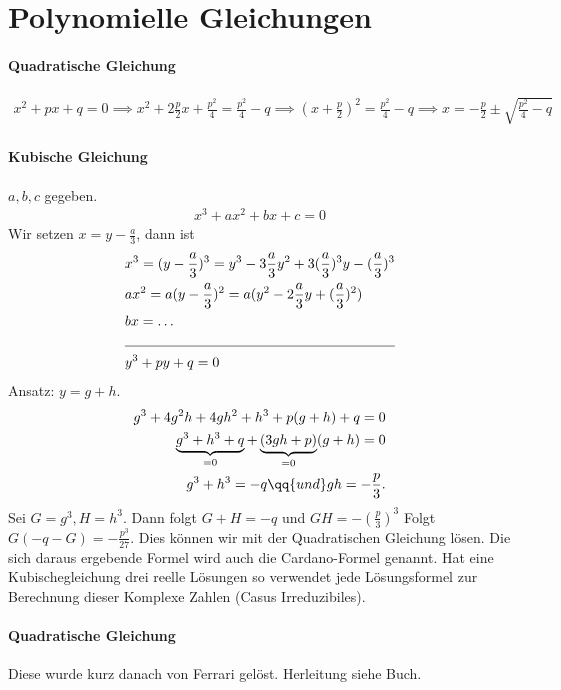 \section{Polynomielle Gleichungen}
\paragraph{Quadratische Gleichung}
\begin{align*}
	x^2 + p x + q = 0 \implies x^2 + 2 \frac{p}{2} x + \frac{p^2}{4} = \frac{p^2}{4} - q \implies (x+\frac{p}{2})^2 = \frac{p^2}{4}-q
	\implies x = -\frac{p}{2} \pm \sqrt{\frac{p^2}{4} - q} 
\end{align*}

\paragraph{Kubische Gleichung}
$a,b,c$ gegeben.
\begin{align*}
	x^3 + a x^2 + b x + c = 0 
\end{align*}
Wir setzen $x = y - \frac{a}{3}$, dann ist
\begin{align*}
	&x^3 = (y-\frac{a}{3})^3 = y^3 - 3 \frac{a}{3} y^2 + 3 (\frac{a}{3})^3 y - (\frac{a}{3})^3\\
	&a x^2 = a(y-\frac{a}{3})^2 = a (y^2 - 2 \frac{a}{3} y + (\frac{a}{3})^2)\\
	&bx = \ldots\\
	\cline{1-2}
	&y^3 + py + q = 0
\end{align*}
Ansatz: $y = g+h$.
\begin{align*}
	g^3 + 4g^2 h + 4 g h^2 + h^3 + p (g+h)  + q = 0\\
	\underbrace{g^3 + h^3 + q}_{=0} + \underbrace{(3gh + p)}_{=0} (g+h) = 0\\
	g^3 + h^3 = -q \qq{und} gh = -\frac{p}{3}
.\end{align*}
Sei $G = g^3, H = h^3$. Dann folgt $G+H = -q$ und $GH = -(\frac{p}{3})^3$
Folgt $G(-q-G) = -\frac{p^3}{27}$. Dies können wir mit der Quadratischen Gleichung lösen.
Die sich daraus ergebende Formel wird auch die Cardano-Formel genannt.
Hat eine Kubischegleichung drei reelle Lösungen so verwendet jede Lösungsformel zur Berechnung dieser Komplexe Zahlen (Casus Irreduzibiles).

\paragraph{Quadratische Gleichung}
Diese wurde kurz danach von Ferrari gelöst. Herleitung siehe Buch.

